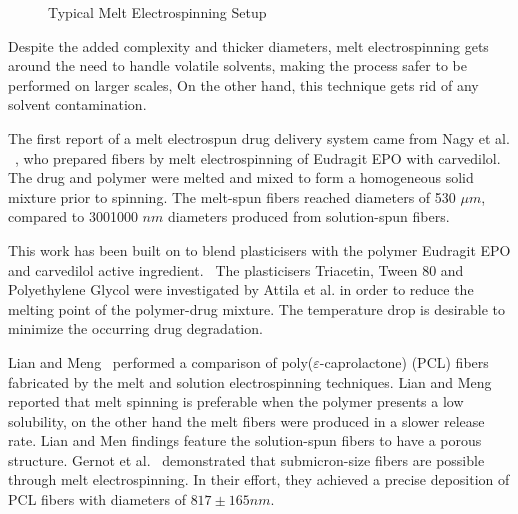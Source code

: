 \documentclass[5p,,preprint,12pt,twocolumn]{elsarticle}
\makeatletter
\def\fixFloatSize#1{}%
\makeatother
\begin{document}
\bgroup
\fixFloatSize{images/9f289b61-472d-4106-8f56-f160403f3ba0-uimg_metl_setup.png}
\begin{figure}[!htbp]
\centering \makeatletter{}
\makeatother 
\caption{{Typical Melt Electrospinning Setup}}
\label{f-1e9a6ae11444}
\end{figure}
\egroup
Despite the added complexity and thicker diameters, melt electrospinning  gets around the need to handle volatile solvents, making the process safer to be performed on larger scales, On the other hand, this technique gets rid of any solvent contamination.

The first report of a melt electrospun drug delivery system came from Nagy et al. \unskip~\cite{527120:13445555}, who prepared fibers by melt electrospinning of Eudragit EPO with carvedilol. The drug and polymer were melted and mixed to form a homogeneous solid mixture prior to spinning. The melt-spun fibers reached diameters of 5{\textendash}30 $\mu m $, compared to 300{\textendash}1000 $nm $ diameters produced from solution-spun fibers. 

This work has been built on to blend plasticisers with the polymer Eudragit EPO and carvedilol active ingredient.\unskip~\cite{527120:13445752} The plasticisers Triacetin, Tween 80 and Polyethylene Glycol were investigated by Attila et al. in order to reduce the melting point of the polymer-drug mixture. The temperature drop is desirable to minimize the occurring drug degradation.

Lian and Meng\unskip~\cite{527120:13445754} performed a comparison of poly(\ensuremath{\varepsilon }-caprolactone) (PCL) fibers fabricated by the melt and solution electrospinning techniques. Lian and Meng\unskip~\cite{527120:13445754} reported that melt spinning is preferable when the polymer presents a low solubility, on the other hand the melt fibers were produced in a slower release rate.  Lian and Men findings feature the solution-spun fibers to have a porous structure. Gernot et al.\unskip~\cite{527120:13534159} demonstrated that submicron-size fibers are possible through melt electrospinning. In their effort, they achieved a precise deposition of PCL fibers with diameters of $817 \pm 165 nm $. 
\end{document}
